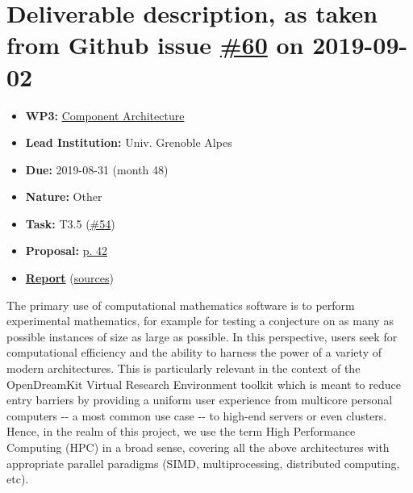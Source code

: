 \hypertarget{deliverable-description-as-taken-from-github-issue-60-on-2019-09-02}{%
\section*{\texorpdfstring{Deliverable description, as taken from Github
issue
\href{https://github.com/OpenDreamKit/OpenDreamKit/issues/60}{\#60} on
2019-09-02}{Deliverable description, as taken from Github issue \#60 on 2019-09-02}}\label{deliverable-description-as-taken-from-github-issue-60-on-2019-09-02}}

\begin{itemize}
\tightlist
\item
  \textbf{WP3:}
  \href{https://github.com/OpenDreamKit/OpenDreamKit/tree/master/WP3}{Component
  Architecture}
\item
  \textbf{Lead Institution:} Univ. Grenoble Alpes
\item
  \textbf{Due:} 2019-08-31 (month 48)
\item
  \textbf{Nature:} Other
\item
  \textbf{Task:} T3.5
  (\href{https://github.com/OpenDreamKit/OpenDreamKit/issues/54}{\#54})
\item
  \textbf{Proposal:}
  \href{https://github.com/OpenDreamKit/OpenDreamKit/raw/master/Proposal/proposal-www.pdf}{p.
  42}
\item
  \textbf{\href{https://github.com/OpenDreamKit/OpenDreamKit/raw/master/WP3/D3.11/report-final.pdf}{Report}}
  (\href{https://github.com/OpenDreamKit/OpenDreamKit/raw/master/WP3/D3.11/}{sources})
\end{itemize}

The primary use of computational mathematics software is to perform
experimental mathematics, for example for testing a conjecture on as
many as possible instances of size as large as possible. In this
perspective, users seek for computational efficiency and the ability to
harness the power of a variety of modern architectures. This is
particularly relevant in the context of the OpenDreamKit Virtual
Research Environment toolkit which is meant to reduce entry barriers by
providing a uniform user experience from multicore personal computers
-\/- a most common use case -\/- to high-end servers or even clusters.
Hence, in the realm of this project, we use the term High Performance
Computing (HPC) in a broad sense, covering all the above architectures
with appropriate parallel paradigms (SIMD, multiprocessing, distributed
computing, etc).

